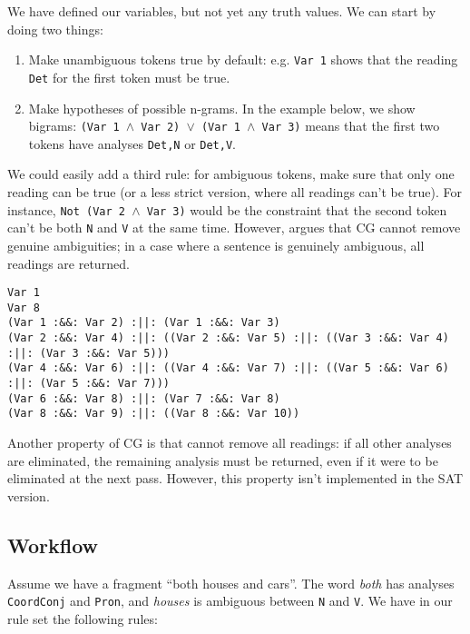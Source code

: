 \documentclass[a4paper, 11pt]{article}
\begin{document}
We have defined our variables, but not yet any truth values. We can
start by doing two things:
\begin{enumerate}
\item Make unambiguous tokens true by default: e.g. \texttt{Var 1}
  shows that the reading \texttt{Det} for the first token must be true.
\item Make hypotheses of possible n-grams. In the example below, we
show bigrams: \texttt{(Var 1 $\wedge$ Var 2) $\vee$ (Var 1 $\wedge$ Var 3)}
means that the first two tokens have analyses \texttt{Det,N} or
\texttt{Det,V}.
\end{enumerate}

We could easily add a third rule: for ambiguous tokens, make sure that
only one reading can be true (or a less strict version, where all
readings can't be true). For instance, \texttt{Not (Var 2 $\wedge$ Var
  3)} would be the constraint that the second token can't be both
\texttt{N} and \texttt{V} at the same time. However,
\cite{KarlssonTODO} argues that CG cannot remove genuine ambiguities;
in a case where a sentence is genuinely ambiguous, all readings are
returned.



\begin{lstlisting}
Var 1
Var 8
(Var 1 :&&: Var 2) :||: (Var 1 :&&: Var 3)
(Var 2 :&&: Var 4) :||: ((Var 2 :&&: Var 5) :||: ((Var 3 :&&: Var 4) :||: (Var 3 :&&: Var 5)))
(Var 4 :&&: Var 6) :||: ((Var 4 :&&: Var 7) :||: ((Var 5 :&&: Var 6) :||: (Var 5 :&&: Var 7)))
(Var 6 :&&: Var 8) :||: (Var 7 :&&: Var 8)
(Var 8 :&&: Var 9) :||: ((Var 8 :&&: Var 10))
\end{lstlisting}

Another property of CG is that cannot remove all readings: if all
other analyses are eliminated, the remaining analysis must be
returned, even if it were to be eliminated at the next pass. 
However, this property isn't implemented in the SAT version.

\subsection{Workflow}

Assume we have a fragment ``both houses and cars''.
The word \emph{both} has analyses \texttt{CoordConj} and
\texttt{Pron}, and \emph{houses} is ambiguous between \texttt{N} and \texttt{V}.
We have in our rule set the following rules:
\end{document}
